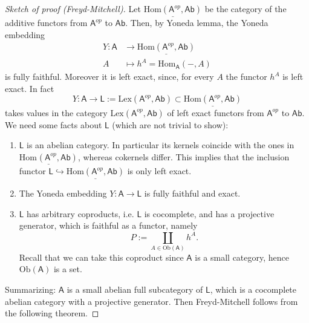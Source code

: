 \begin{proof}[Sketch of proof (Freyd-Mitchell)]
	Let $\underline{\mathrm{Hom}\left( \mathsf{A}^{op}, \mathsf{Ab} \right)}$
	be the category of the additive functors from $\mathsf{A}^{op}$ to $\mathsf{Ab}$.
	Then, by Yoneda lemma, the Yoneda embedding
	\begin{align}
		Y: \mathsf{A} &\to
		\underline{\mathrm{Hom}\left( \mathsf{A}^{op}, \mathsf{Ab} \right)} \\
		A &\mapsto h^A = \mathrm{Hom}_{\mathsf{A}} \left( -, A \right)
	\end{align} 
	is fully faithful.
	Moreover it is left exact, since, for every $A$ the functor $h^A$ is left exact.
	In fact
	\begin{equation}
		Y: \mathsf{A} \to \mathsf{L} := \mathrm{Lex} \left(\mathsf{A}^{op}, \mathsf{Ab}\right) \subset
	\underline{\mathrm{Hom}\left( \mathsf{A}^{op}, \mathsf{Ab} \right)}
	\end{equation} 
	takes values in the category $\mathrm{Lex}\left(\mathsf{A}^{op}, \mathsf{Ab}\right)$ of
	left exact functors from $\mathsf{A}^{op}$ to $\mathsf{Ab}$.
	We need some facts about $\mathsf{L}$ (which are not trivial to show):
	\begin{enumerate}
		\item $\mathsf{L}$ is an abelian category.
			In particular its kernels coincide with the ones in
			$\underline{\mathrm{Hom}_{ }\left( \mathsf{A}^{op}, \mathsf{Ab} \right)}$,
			whereas cokernels differ.
			This implies that the inclusion functor $\mathsf{L} \hookrightarrow
			\underline{\mathrm{Hom}\left( \mathsf{A}^{op}, \mathsf{Ab} \right)}$
			is only left exact.
		\item The Yoneda embedding $Y: \mathsf{A} \to \mathsf{L}$ is fully faithful and exact.
		\item $\mathsf{L}$ has arbitrary coproducts, i.e. $\mathsf{L}$ is cocomplete,
			and has a projective generator, which is faithful as a functor, 
			namely
			\begin{equation}
			P := \coprod_{A \in \mathrm{Ob} \left(\mathsf{A}\right)} h^A
			.\end{equation} 
			Recall that we can take this coproduct since $\mathsf{A}$ is a small category,
			hence $\mathrm{Ob} \left(\mathsf{A}\right)$ is a set.
	\end{enumerate}
	Summarizing: $\mathsf{A}$ is a small abelian full subcategory of $\mathsf{L}$, which is a
	cocomplete abelian category with a projective generator.
	Then Freyd-Mitchell follows from the following theorem.
\end{proof}

